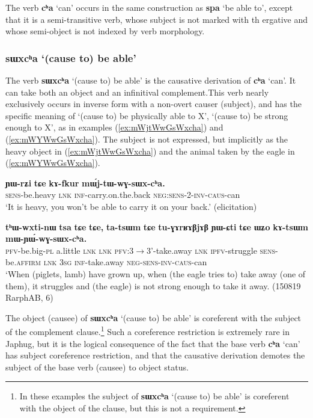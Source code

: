 \documentclass[oneside,a4paper,11pt]{article}
\newcommand{\ipa}[1]{\textbf{\phon#1}} %
\newcommand{\jpg}[2]{\ipa{#1} `#2'} %
\newcommand{\refb}[1]{(\ref{#1})}
\begin{document}
The verb \jpg{cʰa}{can} occurs in the same construction as \jpg{spa}{be able to}, except that it is a semi-transitive verb, whose subject is not marked with th ergative and whose semi-object is not indexed by verb morphology.


  \subsubsection{\jpg{sɯxcʰa}{(cause to) be able}} \label{sec:sWxcha}
The verb \jpg{sɯxcʰa}{(cause to) be able}  is the causative derivation of \jpg{cʰa}{can}.  It can take both an object and an infinitival complement.This verb nearly exclusively occurs in inverse form with a non-overt causer (subject), and has the specific meaning of  `(cause to) be physically able to X', `(cause to) be strong enough to X', as in examples (\ref{ex:mWjtWwGsWxcha}) and (\ref{ex:mWYWwGsWxcha}). The subject is not expressed, but implicitly as the heavy object in \refb{ex:mWjtWwGsWxcha} and the animal taken by the eagle in \refb{ex:mWYWwGsWxcha}.

\begin{exe}
\ex \label{ex:mWjtWwGsWxcha}
\gll \ipa{ɲɯ-rʑi} 	\ipa{tɕe} 	\ipa{kɤ-fkur}  	\ipa{mɯ́j-tɯ-wɣ-sɯx-cʰa.} \\
\textsc{sens}-be.heavy \textsc{lnk}  \textsc{inf}-carry.on.the.back \textsc{neg:sens-2-inv-caus}-can \\
\glt `It is heavy, you won't be able to carry it on your back.' (elicitation)
\end{exe}	

  
\begin{exe}
\ex \label{ex:mWYWwGsWxcha}
\gll \ipa{tʰɯ-wxti-nɯ} 	\ipa{tsa} 	\ipa{tɕe} 	\ipa{tɕe,} 	\ipa{ta-tsɯm} 	\ipa{tɕe} 	\ipa{tu-ɣɤrʁɤβjɤβ} 	\ipa{ɲɯ-ɕti} 	\ipa{tɕe} 	\ipa{ɯʑo} 	\ipa{kɤ-tsɯm} 	\ipa{mɯ-ɲɯ́-wɣ-sɯx-cʰa.} \\
\textsc{pfv}-be.big-\textsc{pl} a.little \textsc{lnk}  \textsc{lnk} \textsc{pfv}:3$\rightarrow$3'-take.away \textsc{lnk} \textsc{ipfv}-struggle \textsc{sens}-be.\textsc{affirm}   \textsc{lnk} \textsc{3sg} \textsc{inf}-take.away \textsc{neg-sens-inv-caus}-can \\
\glt `When (piglets, lamb) have grown up, when (the eagle tries to) take away (one of them), it struggles and (the eagle) is not strong enough to take it away. (150819 RarphAB, 6)
\end{exe}	

The object (causee) of \jpg{sɯxcʰa}{(cause to) be able}  is coreferent with the subject of the complement clause.\footnote{In these examples the subject of \jpg{sɯxcʰa}{(cause to) be able} is coreferent with the object of the clause, but this is not a requirement.} Such a coreference restriction is extremely rare in Japhug, but it is the logical consequence of the fact that the base verb \jpg{cʰa}{can} has subject coreference restriction, and that the causative derivation demotes the subject of the base verb (causee) to object status.
\end{document}
